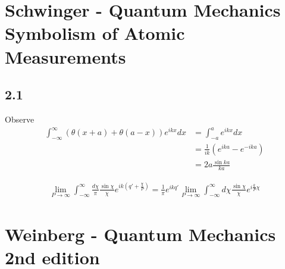 \documentclass[10pt,a4paper]{book}
\theoremstyle{definition}
\begin{document}
\section{{\sc Schwinger} - Quantum Mechanics Symbolism of Atomic Measurements}
\subsection{2.1}
Observe
\begin{align}
    \int_{-\infty}^\infty\left(\theta(x+a)+\theta(a-x)\right)e^{ikx}dx
    &=\int_{-a}^ae^{ikx}dx\\
    &=\frac{1}{ik}\left(e^{ika}-e^{-ika}\right)\\
    &=2a \frac{\sin ka}{ka}
\end{align} 

\begin{align}
    \lim_{P\rightarrow\infty}\int_{-\infty}^\infty\frac{d\chi}{\pi}\frac{\sin\chi}{\chi}e^{ik\left(q'+\frac{\chi}{P}\right)}=\frac{1}{\pi}e^{ikq'}\lim_{P\rightarrow\infty}\int_{-\infty}^\infty d\chi\frac{\sin\chi}{\chi}e^{i\frac{k}{P}\chi}
\end{align} 



\section{{\sc Weinberg} - Quantum Mechanics 2nd edition}
\end{document}
